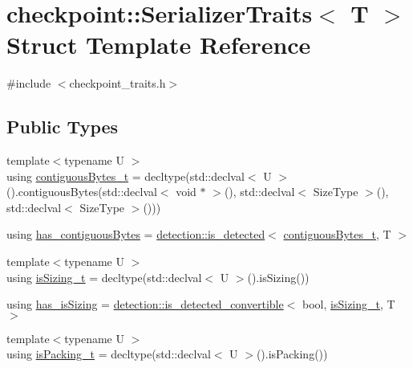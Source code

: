 \hypertarget{structcheckpoint_1_1_serializer_traits}{}\section{checkpoint\+:\+:Serializer\+Traits$<$ T $>$ Struct Template Reference}
\label{structcheckpoint_1_1_serializer_traits}


{\ttfamily \#include $<$checkpoint\+\_\+traits.\+h$>$}

\subsection*{Public Types}
\begin{DoxyCompactItemize}
\item 
{\footnotesize template$<$typename U $>$ }\\using \hyperlink{structcheckpoint_1_1_serializer_traits_aaa8510ef21bb5aac75f50f8038091b86}{contiguous\+Bytes\+\_\+t} = decltype(std\+::declval$<$ U $>$().contiguous\+Bytes(std\+::declval$<$ void $\ast$ $>$(), std\+::declval$<$ Size\+Type $>$(), std\+::declval$<$ Size\+Type $>$()))
\item 
using \hyperlink{structcheckpoint_1_1_serializer_traits_aee3349b1b0e4064b7f3a0baf29580835}{has\+\_\+contiguous\+Bytes} = \hyperlink{namespacedetection_a30893549a3de1e9603d78dad6d5dce92}{detection\+::is\+\_\+detected}$<$ \hyperlink{structcheckpoint_1_1_serializer_traits_aaa8510ef21bb5aac75f50f8038091b86}{contiguous\+Bytes\+\_\+t}, T $>$
\item 
{\footnotesize template$<$typename U $>$ }\\using \hyperlink{structcheckpoint_1_1_serializer_traits_a7b2ce347c816a50063e37b1216076814}{is\+Sizing\+\_\+t} = decltype(std\+::declval$<$ U $>$().is\+Sizing())
\item 
using \hyperlink{structcheckpoint_1_1_serializer_traits_a4dda444a377178bddaa8448a639f9735}{has\+\_\+is\+Sizing} = \hyperlink{namespacedetection_afb970b23e39cfecb33449d40242c49ff}{detection\+::is\+\_\+detected\+\_\+convertible}$<$ bool, \hyperlink{structcheckpoint_1_1_serializer_traits_a7b2ce347c816a50063e37b1216076814}{is\+Sizing\+\_\+t}, T $>$
\item 
{\footnotesize template$<$typename U $>$ }\\using \hyperlink{structcheckpoint_1_1_serializer_traits_aeec71e5f15a9dc7e8a265d40a65518b0}{is\+Packing\+\_\+t} = decltype(std\+::declval$<$ U $>$().is\+Packing())

\end{DoxyCompactItemize}
